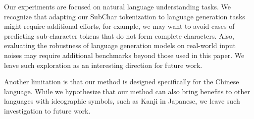 Our experiments are focused on natural language understanding tasks. We recognize that adapting our SubChar tokenization to language generation tasks might require additional efforts, for example, we may want to avoid cases of predicting sub-character tokens that do not form complete characters. Also, evaluating the robustness of language generation models on real-world input noises may require additional benchmarks beyond those used in this paper. We leave such exploration as an interesting direction for future work. 

Another limitation is that our method is designed specifically for the Chinese language. While we hypothesize that our method can also bring benefits to other languages with ideographic symbols, such as Kanji in Japanese, we leave such investigation to future work. 

